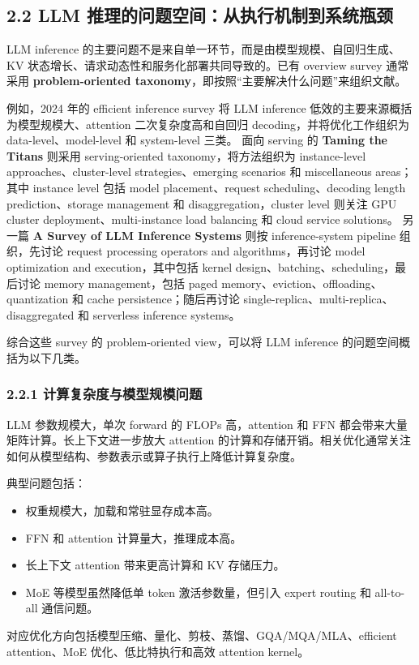 \documentclass[a4paper,twocolumn,10pt]{ctexart}
\begin{document}
\subsection{2.2 LLM 推理的问题空间：从执行机制到系统瓶颈}

LLM inference 的主要问题不是来自单一环节，而是由模型规模、自回归生成、KV 状态增长、请求动态性和服务化部署共同导致的。已有 overview survey 通常采用 \textbf{problem-oriented taxonomy}，即按照“主要解决什么问题”来组织文献。


例如，2024 年的 efficient inference survey 将 LLM inference 低效的主要来源概括为模型规模大、attention 二次复杂度高和自回归 decoding，并将优化工作组织为 data-level、model-level 和 system-level 三类。  面向 serving 的 \textbf{Taming the Titans} 则采用 serving-oriented taxonomy，将方法组织为 instance-level approaches、cluster-level strategies、emerging scenarios 和 miscellaneous areas；其中 instance level 包括 model placement、request scheduling、decoding length prediction、storage management 和 disaggregation，cluster level 则关注 GPU cluster deployment、multi-instance load balancing 和 cloud service solutions。  另一篇 \textbf{A Survey of LLM Inference Systems} 则按 inference-system pipeline 组织，先讨论 request processing operators and algorithms，再讨论 model optimization and execution，其中包括 kernel design、batching、scheduling，最后讨论 memory management，包括 paged memory、eviction、offloading、quantization 和 cache persistence；随后再讨论 single-replica、multi-replica、disaggregated 和 serverless inference systems。 


综合这些 survey 的 problem-oriented view，可以将 LLM inference 的问题空间概括为以下几类。




\subsubsection{2.2.1 计算复杂度与模型规模问题}

LLM 参数规模大，单次 forward 的 FLOPs 高，attention 和 FFN 都会带来大量矩阵计算。长上下文进一步放大 attention 的计算和存储开销。相关优化通常关注如何从模型结构、参数表示或算子执行上降低计算复杂度。


典型问题包括：


\begin{itemize}
\item 权重规模大，加载和常驻显存成本高。

\item FFN 和 attention 计算量大，推理成本高。

\item 长上下文 attention 带来更高计算和 KV 存储压力。

\item MoE 等模型虽然降低单 token 激活参数量，但引入 expert routing 和 all-to-all 通信问题。

\end{itemize}
对应优化方向包括模型压缩、量化、剪枝、蒸馏、GQA/MQA/MLA、efficient attention、MoE 优化、低比特执行和高效 attention kernel。
\end{document}
